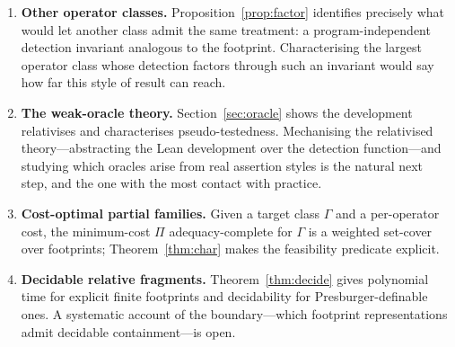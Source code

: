\documentclass[runningheads,envcountsect,envcountsame]{llncs}
\begin{document}
\begin{enumerate}
\item \textbf{Other operator classes.} Proposition~\ref{prop:factor} identifies
precisely what would let another class admit the same treatment: a
program-independent detection invariant analogous to the footprint.
Characterising the largest operator class whose detection factors through such an
invariant would say how far this style of result can reach.
\item \textbf{The weak-oracle theory.} Section~\ref{sec:oracle} shows the
development relativises and characterises pseudo-testedness. Mechanising the
relativised theory---abstracting the Lean development over the detection
function---and studying which oracles arise from real assertion styles is the
natural next step, and the one with the most contact with practice.
\item \textbf{Cost-optimal partial families.} Given a target class $\Gamma$ and a
per-operator cost, the minimum-cost $\Pi$ adequacy-complete for $\Gamma$ is a
weighted set-cover over footprints; Theorem~\ref{thm:char} makes the feasibility
predicate explicit.
\item \textbf{Decidable relative fragments.} Theorem~\ref{thm:decide} gives
polynomial time for explicit finite footprints and decidability for
Presburger-definable ones. A systematic account of the boundary---which footprint
representations admit decidable containment---is open.
\end{enumerate}
\end{document}
